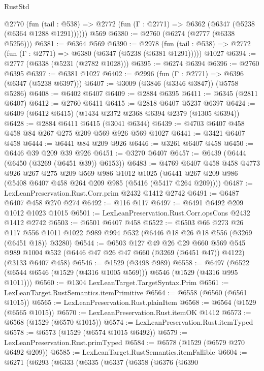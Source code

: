 \begin{lexlean}{RustStd}
\begin{coremodule}
    @2770
      (fun (tail : @538) => @2772 (fun (Γ : @2771) => @6362 (@6347 (@5238 (@6364 @1288 @1291))))))
    @569
@6380 := @2760 (@6274 (@2777 (@6338 @5256)))
@6381 := @6364 @569
@6390 := @2978
    (fun (tail : @538) => @2772 (fun (Γ : @2771) => @6380 (@6347 (@5238 (@6381 @1291)))))
    @1027
@6394 := @2777 (@6338 (@5231 (@2782 @1028)))
@6395 := @6274 @6394
@6396 := @2760 @6395
@6397 := @6381 @1027
@6402 := @2996 (fun (Γ : @2771) => @6396 (@6347 (@5238 @6397)))
@6407 := @3009 (@3846 (@3346 @3847)) (@5758 @5286)
@6408 := @6402 @6407
@6409 := @2884 @6395
@6411 := @6345 (@2811 @6407)
@6412 := @2760 @6411
@6415 := @2818 @6407 @5237 @6397
@6424 := @6409 (@6412 @6415) (@1434 @2372 @2368 @6394 @2379 (@1305 @6394))
@6428 := @2884 @6411 @6415 (@3041 @6344)
@6439 := @4703 @6407 @458 @458 @84 @267 @275 @209 @569 @926 @569 @1027
@6441 := @3421 @6407 @458
@6444 := @6441 @84 @209 @926
@6446 := @3261 @6407 @458
@6450 := @6446 @39 @209 @39 @926
@6451 := @3270 @6407
@6457 := @6439 (@6444 (@6450 (@3269 (@6451 @39)) @6153))
@6483 := @4769
    @6407
    @458
    @458
    @4773
    @926
    @267
    @275
    @209
    @569
    @986
    @1012
    @1025
    (@6441 @267 @209 @986 (@5408 @6407 @458 @264 @209 @985 (@5416 (@5417 @264 @209))))
@6487 := LexLeanPreservation.Rust.Corr.prim @2432 @1412 @2742
@6491 := @6487 @6407 @458 @270 @274
@6492 := @116 @117
@6497 := @6491 @6492 @209 @1012 @1023 @1015
@6501 := LexLeanPreservation.Rust.Corr.opsCons @2432 @1412 @2742
@6503 := @6501 @6407 @458
@6522 := @6503
    @66
    @273
    @26
    @117
    @556
    @1011
    @1022
    @989
    @994
    @532
    (@6446 @18 @26 @18 @556 (@3269 (@6451 @18)) @3280)
@6544 := @6503
    @127
    @49
    @26
    @29
    @660
    @569
    @545
    @989
    @1004
    @532
    (@6446 @47 @26 @47 @660 (@3269 (@6451 @47)) @4122)
    (@3133 @6407 @458)
@6546 := @1529 (@3498 @989)
@6558 := @6497 (@6522 (@6544 @6546 (@1529 (@4316 @1005 @569))) @6546 (@1529 (@4316 @995 @1011)))
@6560 := @1304 LexLeanTarget.TargetSyntax.Prim
@6561 := LexLeanTarget.RustSemantics.itemPrimitive
@6564 := @6558 (@6560 (@6561 @1015))
@6565 := LexLeanPreservation.Rust.plainItem
@6568 := @6564 (@1529 (@6565 @1015))
@6570 := LexLeanPreservation.Rust.itemOK @1412
@6573 := @6568 (@1529 (@6570 @1015))
@6574 := LexLeanPreservation.Rust.itemTyped
@6578 := @6573 (@1529 (@6574 @1015 @6492))
@6579 := LexLeanPreservation.Rust.primTyped
@6584 := @6578 (@1529 (@6579 @270 @6492 @209))
@6585 := LexLeanTarget.RustSemantics.itemFallible
@6604 := @6271
    (@6293
      (@6333
        (@6335
          (@6337
            (@6358
              (@6376
                (@6390

\end{coremodule}
\end{lexlean}
